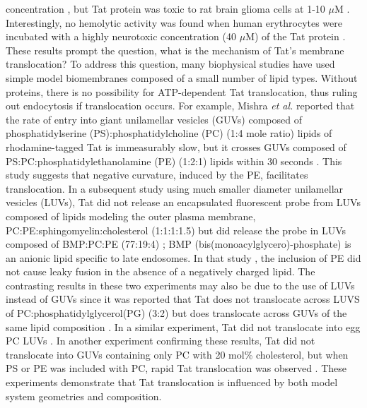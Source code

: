 concentration \cite{Vives97}, but Tat protein was toxic 
to rat brain glioma cells at 1-10 $\mu$M \cite{Sabatier91}. 
Interestingly, no hemolytic activity was found when human erythrocytes
were incubated with a highly neurotoxic concentration (40 $\mu$M) of the Tat protein 
\cite{Sabatier91}. 
These results prompt the question, what is the mechanism of 
Tat’s membrane translocation?
To address this question, many biophysical studies have used simple model
biomembranes composed of a small number of lipid types. 
Without proteins, there is no possibility for ATP-dependent Tat translocation, 
thus ruling out endocytosis if
translocation occurs. 
For example, Mishra \textit{et al.} reported that the rate of 
entry into giant
unilamellar vesicles (\acs{GUV}s) composed of phosphatidylserine (\acs{PS}):phosphatidylcholine (\acs{PC})
(1:4 mole ratio) lipids of rhodamine-tagged Tat
is immeasurably slow, but it crosses GUVs composed of 
PS:PC:phosphatidylethanolamine (\acs{PE}) (1:2:1) lipids 
within 30 seconds \cite{Mishra08}. 
This study suggests that negative curvature, induced by the PE, 
facilitates translocation. 
In a subsequent study using much smaller diameter unilamellar vesicles (\acs{LUV}s),
Tat did not release an encapsulated fluorescent probe from LUVs composed of 
lipids modeling the outer plasma membrane, PC:PE:sphingomyelin:cholesterol (1:1:1:1.5) 
but did release the probe in LUVs composed of BMP:PC:PE (77:19:4) \cite{Yang10}; 
BMP (bis(monoacylglycero)-phosphate) is an anionic lipid specific to late 
endosomes. 
In that study \cite{Yang10}, the inclusion of PE did not 
cause leaky fusion in the absence of a negatively charged lipid. 
The 
contrasting results in these two experiments may also be due to the use of LUVs 
instead of GUVs since it was reported that Tat does not translocate across LUVS 
of PC:phosphatidylglycerol(\acs{PG}) (3:2) but does translocate across GUVs of the same lipid composition 
\cite{Thoren04}. In a similar experiment, Tat did not translocate into egg PC
LUVs \cite{Kramer03}. 
In another experiment confirming these results, Tat did 
not translocate into GUVs containing only PC with 20 mol\% cholesterol, but 
when PS or PE was included with PC, rapid Tat translocation was observed 
\cite{Ciobanasu10}. 
These experiments demonstrate that Tat translocation is influenced by both
model system geometries and composition.

